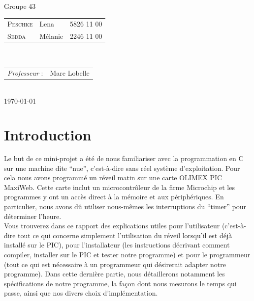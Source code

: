 \documentclass[12pt,a4paper]{article}
\begin{document}
\begin{titlepage}

\large
\begin{centering}
Groupe 43\\
\end{centering}
{\begin{tabular}{lll}
\textsc{Peschke} & Lena & 5826 11 00\\
\textsc{Sedda} & Mélanie & 2246 11 00\\
\end{tabular}}
\\[1cm]

\normalsize
{\begin{tabular}{ll}
\textit{Professeur} : & Marc Lobelle \\
\end{tabular}}
\\[1cm]


{\normalsize \today} %

\newpage

\end{titlepage}


\clearpage
\thispagestyle{empty}
\tableofcontents
\clearpage
{}


\section{Introduction}

Le but de ce mini-projet a été de nous familiariser avec la programmation en C sur une machine dite ``nue'', c'est-à-dire sans réel système d'exploitation. Pour cela nous avons programmé un réveil matin sur une carte OLIMEX PIC MaxiWeb. Cette carte inclut un microcontrôleur de la firme Microchip et les programmes y ont un accès direct à la mémoire et aux périphériques. En particulier, nous avons dû utiliser nous-mêmes les interruptions du ``timer'' pour déterminer l'heure. \cite{foditic}\\

Vous trouverez dans ce rapport des explications utiles pour l'utilisateur (c'est-à-dire tout ce qui concerne simplement l'utilisation du réveil lorsqu'il est déjà installé sur le PIC), pour l'installateur (les instructions décrivant comment compiler, installer sur le PIC et tester notre programme) et pour le programmeur (tout ce qui est nécessaire à un programmeur qui désirerait adapter notre programme). Dans cette dernière partie, nous détaillerons notamment les spécifications de notre programme, la façon dont nous mesurons le temps qui passe, ainsi que nos divers choix d'implémentation.
\end{document}
